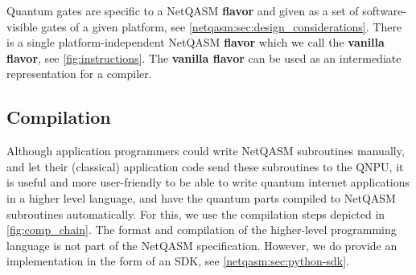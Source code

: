 
Quantum gates are specific to a \ac{NetQASM} \textbf{flavor} and given as a set of software-visible gates of a given platform, see \cref{netqasm:sec:design_considerations}.
There is a single platform-independent \ac{NetQASM} \textbf{flavor} which we call the \textbf{vanilla flavor}, see \cref{fig:instructions}.
The \textbf{vanilla flavor} can be used as an intermediate representation for a compiler.


\subsection{Compilation}
Although application programmers could write \ac{NetQASM} subroutines manually, and let their (classical) application code send these subroutines to the \ac{QNPU}, it is useful and more user-friendly to be able to write quantum internet applications in a higher level language, and have the quantum parts compiled to \ac{NetQASM} subroutines automatically.
For this, we use the compilation steps depicted in \cref{fig:comp_chain}.
The format and compilation of the higher-level programming language is not part of the \ac{NetQASM} specification.
However, we do provide an implementation in the form of an SDK, see \cref{netqasm:sec:python-sdk}.

